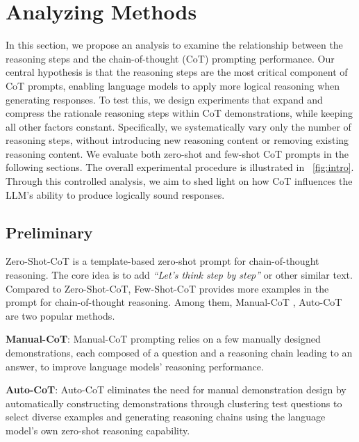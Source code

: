 \documentclass[11pt]{article}
\begin{document}
\section{Analyzing Methods}
\label{sec:methods}
In this section, we propose an analysis to examine the relationship between the reasoning steps and the chain-of-thought (CoT) prompting performance. Our central hypothesis is that the reasoning steps are the most critical component of CoT prompts, enabling language models to apply more logical reasoning when generating responses.
To test this, we design experiments that expand and compress the rationale reasoning steps within CoT demonstrations, while keeping all other factors constant. Specifically, we systematically vary only the number of reasoning steps, without introducing new reasoning content or removing existing reasoning content. We evaluate both zero-shot and few-shot CoT prompts in the following sections. The overall experimental procedure is illustrated in ~\autoref{fig:intro}. Through this controlled analysis, we aim to shed light on how CoT influences the LLM's ability to produce logically sound responses.


\phantom{Invisible Text}
\vspace{-\baselineskip}

\subsection{Preliminary}

Zero-Shot-CoT \cite{kojima2023large} is a template-based zero-shot prompt for chain-of-thought reasoning. The core idea is to add \textit{``Let's think step by step''} or other similar text. Compared to Zero-Shot-CoT, Few-Shot-CoT provides more examples in the prompt for chain-of-thought reasoning. Among them, Manual-CoT \cite{wei2022chain}, Auto-CoT \cite{zhang2022automatic} are two popular methods.

\noindent
\textbf{Manual-CoT}: Manual-CoT prompting relies on a few manually designed demonstrations, each composed of a question and a reasoning chain leading to an answer, to improve language models' reasoning performance.

\noindent
\textbf{Auto-CoT}: Auto-CoT eliminates the need for manual demonstration design by automatically constructing demonstrations through clustering test questions to select diverse examples and generating reasoning chains using the language model's own zero-shot reasoning capability.
\end{document}
